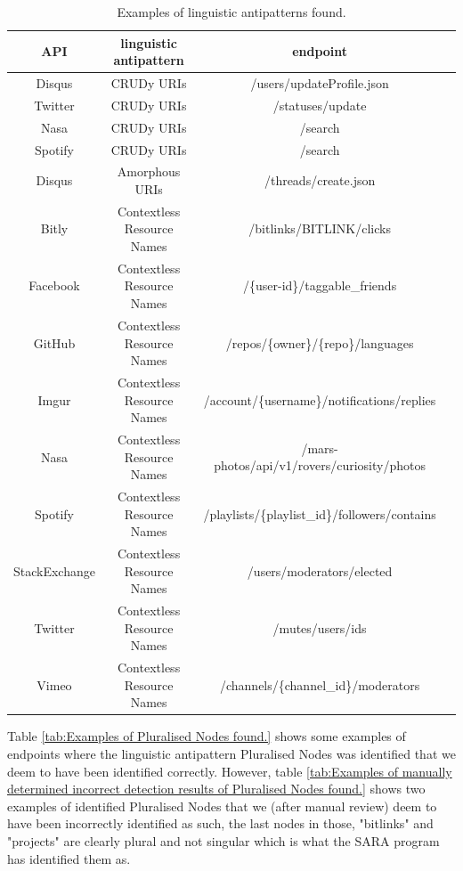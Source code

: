 \begin{table}[htb!]
    \centering
    \begin{tabular}{|c|c|c|c|}
        \hline
        API & linguistic antipattern & endpoint \\ \hline
        Disqus & CRUDy URIs & /users/updateProfile.json \\  \hline
        Twitter & CRUDy URIs & /statuses/update \\ \hline
        Nasa & CRUDy URIs & /search \\  \hline
        Spotify & CRUDy URIs & /search \\  \hline
        Disqus & Amorphous URIs & /threads/create.json \\ \hline
        Bitly & Contextless Resource Names & /bitlinks/{BITLINK}/clicks \\ \hline
        Facebook & Contextless Resource Names & /\{user-id\}/taggable\_friends \\ \hline
        GitHub & Contextless Resource Names & /repos/\{owner\}/\{repo\}/languages \\ \hline
        Imgur & Contextless Resource Names & /account/\{username\}/notifications/replies \\ \hline
        Nasa & Contextless Resource Names & /mars-photos/api/v1/rovers/curiosity/photos \\ \hline
        Spotify & Contextless Resource Names &
        /playlists/\{playlist\_id\}/followers/contains \\ \hline
        StackExchange & Contextless Resource Names & /users/moderators/elected \\ \hline
        Twitter & Contextless Resource Names & /mutes/users/ids \\ \hline
        Vimeo & Contextless Resource Names &
        /channels/\{channel\_id\}/moderators \\ \hline
    \end{tabular}
    \caption{Examples of linguistic antipatterns found.}
    \label{tab:Examples of linguistic antipatterns found.}
\end{table}

Table \ref{tab:Examples of Pluralised Nodes found.} shows some examples of endpoints where the linguistic antipattern Pluralised Nodes was identified that we deem to have been identified correctly. However, table \ref{tab:Examples of manually determined incorrect detection results of Pluralised Nodes found.} shows two examples of identified Pluralised Nodes that we (after manual review) deem to have been incorrectly identified as such, the last nodes in those, "bitlinks" and "projects" are clearly plural and not singular which is what the SARA program has identified them as.

